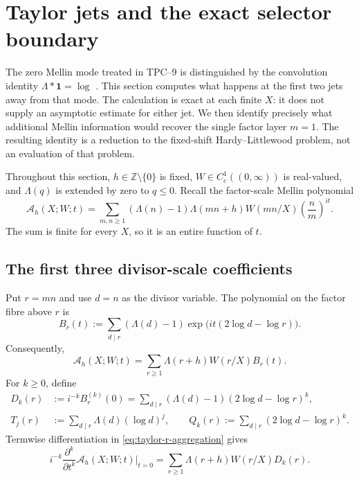 \section{Taylor jets and the exact selector boundary}
\label{sec:taylor-selector-boundary}

The zero Mellin mode treated in TPC--9 is distinguished by the convolution
identity $\Lambda*\mathbf 1=\log$ \citep{WangTPCNine2026}.  This section
computes what happens at the first two jets away from that mode.  The
calculation is exact at each finite $X$: it does not supply an asymptotic
estimate for either jet.  We then identify precisely what additional Mellin
information would recover the single factor layer $m=1$.  The resulting
identity is a reduction to the fixed-shift Hardy--Littlewood problem, not an
evaluation of that problem.

Throughout this section, $h\in\mathbb Z\setminus\{0\}$ is fixed,
$W\in C_c^1((0,\infty))$ is real-valued, and $\Lambda(q)$ is extended by
zero to $q\leq 0$.  Recall the factor-scale Mellin polynomial
\begin{equation}
 \mathcal A_h(X;W;t)
 =\sum_{m,n\geq1}(\Lambda(n)-1)\Lambda(mn+h)W(mn/X)
   \left(\frac{n}{m}\right)^{it}.
 \label{eq:taylor-global-polynomial}
\end{equation}
The sum is finite for every $X$, so it is an entire function of $t$.

\subsection{The first three divisor-scale coefficients}
\label{subsec:taylor-first-jets}

Put $r=mn$ and use $d=n$ as the divisor variable.  The polynomial on the
factor fibre above $r$ is
\begin{equation}
 B_r(t)
 :=\sum_{d\mid r}(\Lambda(d)-1)
       \exp\!\bigl(it(2\log d-\log r)\bigr).
 \label{eq:taylor-Br-definition}
\end{equation}
Consequently,
\begin{equation}
 \mathcal A_h(X;W;t)
 =\sum_{r\geq1}\Lambda(r+h)W(r/X)B_r(t).
 \label{eq:taylor-r-aggregation}
\end{equation}
For $k\geq0$, define
\begin{align}
 D_k(r)&:=i^{-k}B_r^{(k)}(0)
   =\sum_{d\mid r}(\Lambda(d)-1)
      (2\log d-\log r)^k,
 \label{eq:taylor-Dk-definition}\\
 T_j(r)&:=\sum_{d\mid r}\Lambda(d)(\log d)^j,
 \qquad
 Q_k(r):=\sum_{d\mid r}(2\log d-\log r)^k.
 \label{eq:taylor-Tj-Qk-definition}
\end{align}
Termwise differentiation in \eqref{eq:taylor-r-aggregation} gives
\begin{equation}
 i^{-k}\frac{\partial^k}{\partial t^k}
 \mathcal A_h(X;W;t)\bigg|_{t=0}
 =\sum_{r\geq1}\Lambda(r+h)W(r/X)D_k(r).
 \label{eq:taylor-global-derivative}
\end{equation}

